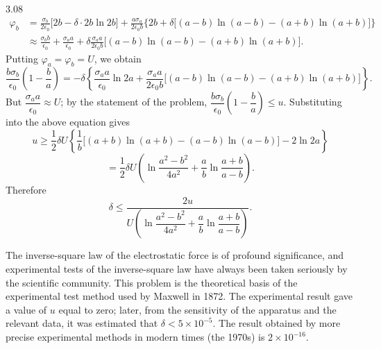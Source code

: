 \begin{solution}{3.08}
\begin{align*}
\varphi_b&=\frac{\sigma_b}{2\epsilon_0}\bigl[2b-\delta\cdot 2b\ln 2b\bigr]
+\frac{a\sigma_a}{2\epsilon_0b}\bigl\{2b+\delta\bigl[(a-b)\ln(a-b)-(a+b)\ln(a+b)\bigr]\bigr\}\\
&\approx\frac{\sigma_bb}{\epsilon_0}+\frac{\sigma_aa}{\epsilon_0}
+\delta\frac{\sigma_aa}{2\epsilon_0b}\bigl[(a-b)\ln(a-b)-(a+b)\ln(a+b)\bigr].
\end{align*}
Putting $\varphi_a=\varphi_b=U$, we obtain
\[
\frac{b\sigma_b}{\epsilon_0}\left(1-\frac{b}{a}\right)
=-\delta\left\{\frac{\sigma_aa}{\epsilon_0}\ln 2a
+\frac{\sigma_aa}{2\epsilon_0b}\bigl[(a-b)\ln(a-b)-(a+b)\ln(a+b)\bigr]\right\}.
\]
But $\dfrac{\sigma_aa}{\epsilon_0}\approx U$; by the statement of the problem, $\dfrac{b\sigma_b}{\epsilon_0}\left(1-\dfrac{b}{a}\right)\le u$. Substituting into the above equation gives
\[
u\ge\frac{1}{2}\delta U\left\{\frac{1}{b}\bigl[(a+b)\ln(a+b)-(a-b)\ln(a-b)\bigr]-2\ln 2a\right\}
\]
\[
=\frac{1}{2}\delta U\left(\ln\frac{a^2-b^2}{4a^2}+\frac{a}{b}\ln\frac{a+b}{a-b}\right).
\]
Therefore
\[
\delta\le\frac{2u}{U\left(\ln\dfrac{a^2-b^2}{4a^2}+\dfrac{a}{b}\ln\dfrac{a+b}{a-b}\right)}.
\]

\begin{commentary}
The inverse-square law of the electrostatic force is of profound significance, and experimental tests of the inverse-square law have always been taken seriously by the scientific community. This problem is the theoretical basis of the experimental test method used by Maxwell in 1872. The experimental result gave a value of $u$ equal to zero; later, from the sensitivity of the apparatus and the relevant data, it was estimated that $\delta<5\times10^{-5}$. The result obtained by more precise experimental methods in modern times (the 1970s) is $2\times10^{-16}$.
\end{commentary}
\end{solution}

